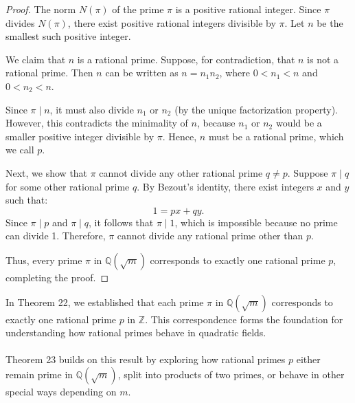 \documentclass{article}
\begin{document}
\begin{proof}
    The norm \( N(\pi) \) of the prime \( \pi \) is a positive rational integer. Since \( \pi \) divides \( N(\pi) \), there exist positive rational integers divisible by \( \pi \). Let \( n \) be the smallest such positive integer.

    We claim that \( n \) is a rational prime. Suppose, for contradiction, that \( n \) is not a rational prime. Then \( n \) can be written as \( n = n_1 n_2 \), where \( 0 < n_1 < n \) and \( 0 < n_2 < n \). 
    
    Since \( \pi \mid n \), it must also divide \( n_1 \) or \( n_2 \) (by the unique factorization property). However, this contradicts the minimality of \( n \), because \( n_1 \) or \( n_2 \) would be a smaller positive integer divisible by \( \pi \). Hence, \( n \) must be a rational prime, which we call \( p \).
    
    Next, we show that \( \pi \) cannot divide any other rational prime \( q \neq p \). Suppose \( \pi \mid q \) for some other rational prime \( q \). By Bezout's identity, there exist integers \( x \) and \( y \) such that:
    \[
    1 = px + qy.
    \]
    Since \( \pi \mid p \) and \( \pi \mid q \), it follows that \( \pi \mid 1 \), which is impossible because no prime can divide 1. Therefore, \( \pi \) cannot divide any rational prime other than \( p \).
    
    Thus, every prime \( \pi \) in \( \mathbb{Q}(\sqrt{m}) \) corresponds to exactly one rational prime \( p \), completing the proof.
\end{proof}

\noindent
 In Theorem 22, we established that each prime \( \pi \) in \( \mathbb{Q}(\sqrt{m}) \) corresponds to exactly one rational prime \( p \) in \( \mathbb{Z} \). This correspondence forms the foundation for understanding how rational primes behave in quadratic fields.\\\\
\noindent
 Theorem 23 builds on this result by exploring how rational primes \( p \) either remain prime in \( \mathbb{Q}(\sqrt{m}) \), split into products of two primes, or behave in other special ways depending on \( m \).
\end{document}

